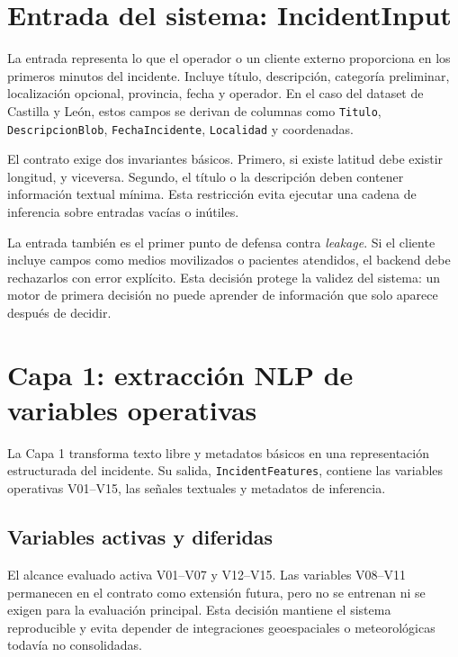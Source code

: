 \section{Entrada del sistema: IncidentInput}

La entrada representa lo que el operador o un cliente externo proporciona en los primeros minutos del incidente. Incluye título, descripción, categoría preliminar, localización opcional, provincia, fecha y operador. En el caso del dataset de Castilla y León, estos campos se derivan de columnas como \texttt{Titulo}, \texttt{DescripcionBlob}, \texttt{FechaIncidente}, \texttt{Localidad} y coordenadas.

El contrato exige dos invariantes básicos. Primero, si existe latitud debe existir longitud, y viceversa. Segundo, el título o la descripción deben contener información textual mínima. Esta restricción evita ejecutar una cadena de inferencia sobre entradas vacías o inútiles.

La entrada también es el primer punto de defensa contra \textit{leakage}. Si el cliente incluye campos como medios movilizados o pacientes atendidos, el backend debe rechazarlos con error explícito. Esta decisión protege la validez del sistema: un motor de primera decisión no puede aprender de información que solo aparece después de decidir.

\section{Capa 1: extracción NLP de variables operativas}

La Capa 1 transforma texto libre y metadatos básicos en una representación estructurada del incidente. Su salida, \texttt{IncidentFeatures}, contiene las variables operativas V01--V15, las señales textuales y metadatos de inferencia.

\subsection{Variables activas y diferidas}

El alcance evaluado activa V01--V07 y V12--V15. Las variables V08--V11 permanecen en el contrato como extensión futura, pero no se entrenan ni se exigen para la evaluación principal. Esta decisión mantiene el sistema reproducible y evita depender de integraciones geoespaciales o meteorológicas todavía no consolidadas.

